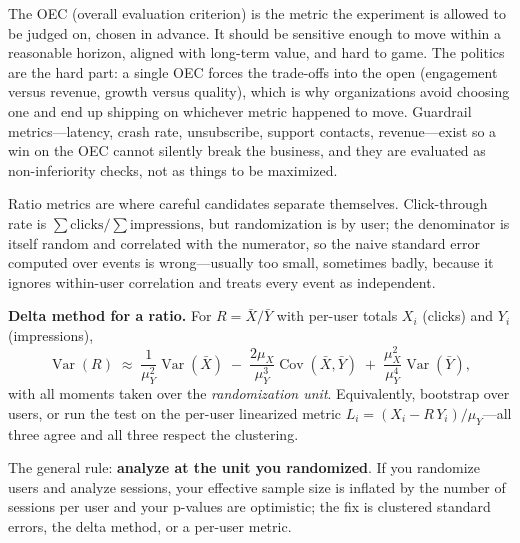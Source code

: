 The OEC (overall evaluation criterion) is the metric the experiment is allowed to be judged on, chosen in advance. It should be sensitive enough to move within a reasonable horizon, aligned with long-term value, and hard to game. The politics are the hard part: a single OEC forces the trade-offs into the open (engagement versus revenue, growth versus quality), which is why organizations avoid choosing one and end up shipping on whichever metric happened to move. Guardrail metrics---latency, crash rate, unsubscribe, support contacts, revenue---exist so a win on the OEC cannot silently break the business, and they are evaluated as non-inferiority checks, not as things to be maximized.

Ratio metrics are where careful candidates separate themselves. Click-through rate is $\sum \text{clicks} / \sum \text{impressions}$, but randomization is by user; the denominator is itself random and correlated with the numerator, so the naive standard error computed over events is wrong---usually too small, sometimes badly, because it ignores within-user correlation and treats every event as independent.

\begin{mathresult}
\textbf{Delta method for a ratio.} For $R = \bar X / \bar Y$ with per-user totals $X_i$ (clicks) and $Y_i$ (impressions),
\begin{equation*}
\operatorname{Var}(R) \;\approx\; \frac{1}{\mu_Y^2}\operatorname{Var}(\bar X) \;-\; \frac{2\mu_X}{\mu_Y^3}\operatorname{Cov}(\bar X, \bar Y) \;+\; \frac{\mu_X^2}{\mu_Y^4}\operatorname{Var}(\bar Y),
\end{equation*}
with all moments taken over the \emph{randomization unit}. Equivalently, bootstrap over users, or run the test on the per-user linearized metric $L_i = (X_i - R\,Y_i)/\mu_Y$---all three agree and all three respect the clustering.
\end{mathresult}

The general rule: \textbf{analyze at the unit you randomized}. If you randomize users and analyze sessions, your effective sample size is inflated by the number of sessions per user and your p-values are optimistic; the fix is clustered standard errors, the delta method, or a per-user metric.

